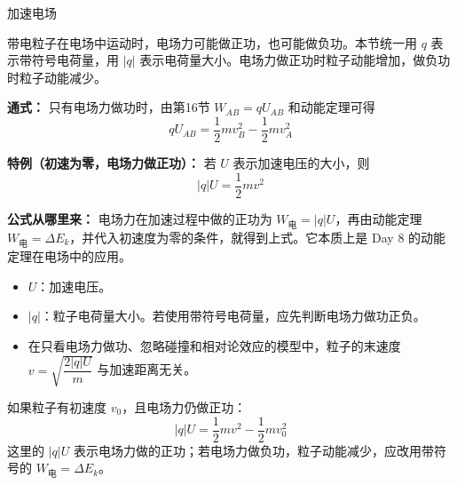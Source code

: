 \begin{conceptbox}{加速电场}

带电粒子在电场中运动时，电场力可能做正功，也可能做负功。本节统一用
$q$ 表示带符号电荷量，用 $|q|$ 表示电荷量大小。电场力做正功时粒子动能增加，做负功时粒子动能减少。

\begin{center}


\label{fig:accelerating-field}
\end{center}

\textbf{通式：} 只有电场力做功时，由第16节
$W_{AB}=qU_{AB}$ 和动能定理可得
\[
\boxed{qU_{AB}=\frac12mv_B^2-\frac12mv_A^2}
\]

\textbf{特例（初速为零，电场力做正功）：} 若 $U$ 表示加速电压的大小，则
\[
\boxed{\lvert q\rvert U = \frac12 mv^2}
\]

\textbf{公式从哪里来：} 电场力在加速过程中做的正功为 $W_{\text{电}}=\lvert q\rvert U$，再由动能定理 $W_{\text{电}}=\Delta E_k$，并代入初速度为零的条件，就得到上式。它本质上是 Day 8 的动能定理在电场中的应用。

\begin{itemize}
  \item $U$：加速电压。
  \item $\lvert q\rvert$：粒子电荷量大小。若使用带符号电荷量，应先判断电场力做功正负。
  \item 在只看电场力做功、忽略碰撞和相对论效应的模型中，粒子的末速度 $v = \sqrt{\dfrac{2\lvert q\rvert U}{m}}$ 与加速距离无关。
\end{itemize}

如果粒子有初速度 $v_0$，且电场力仍做正功：
\[
\lvert q\rvert U = \frac12 mv^2 - \frac12 mv_0^2
\]
这里的 $\lvert q\rvert U$ 表示电场力做的正功；若电场力做负功，粒子动能减少，应改用带符号的 $W_{\text{电}}=\Delta E_k$。

\end{conceptbox}

